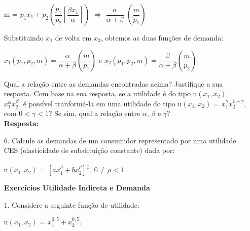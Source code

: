 \begin{enumerate}
\begin{center}
m = {$p_{1}x_{1}+p_{2} \left(\dfrac{p_1}{p_2}\left[\dfrac{\beta x_{1}}{\alpha}\right]\right)$}
{$\Rightarrow$} {$\dfrac{\alpha}{\alpha + \beta}$} {$\left(\dfrac{m}{p_1}\right)$}\\

\end{center}

Substituindo {$x_1$} de volta em {$x_2$}, obtemos as duas funções de demanda:\\

\begin{center}

{$x_1(p_1,p_2,m) = \dfrac{\alpha}{\alpha + \beta} \left(\dfrac{m}{p_1}\right)$} e {$x_2(p_1,p_2,m) = \dfrac{\beta}{\alpha + \beta} \left(\dfrac{m}{p_2}\right)$}

\end{center}

Qual a relação entre as demandas encontradas acima? Justifique a sua resposta. Com base
na sua resposta, se a utilidade é do tipo u{$(x_1, x_2)$} = {$x^\alpha_1 x^\beta_2$}, é possível tranformá-la em uma utilidade do tipo u{$(x_1, x_2)$} = {$x_{1}^{\gamma}x_{2}^{1-\gamma}$}, com {$0 < \gamma < 1$}? Se sim, qual a relação entre {$\alpha$}, {$\beta$} e {$\gamma$}?\\


\textbf{Resposta:}\\

\item[6.] Calcule as demandas de um consumidor representado por uma utilidade CES (elasticidade
de substituição constante) dada por:\\

\begin{center}
u{$(x_1, x_2)$} = {$[ax_{1}^{\rho} + bx_{2}^{\rho}]^\frac{1}{\rho}$},   {$0\neq \rho < 1$}.\\
\end{center}

\newpage

\begin{center}
\textbf{Exercícios Utilidade Indireta e Demanda}\\
\end{center}

\item[1.] Considere a seguinte função de utilidade:\\

\begin{center}
u{$(x_1, x_2)$} = {$x_{1}^{0,5} + x_{2}^{0,5}$}.\\
\end{center}


\end{enumerate}
